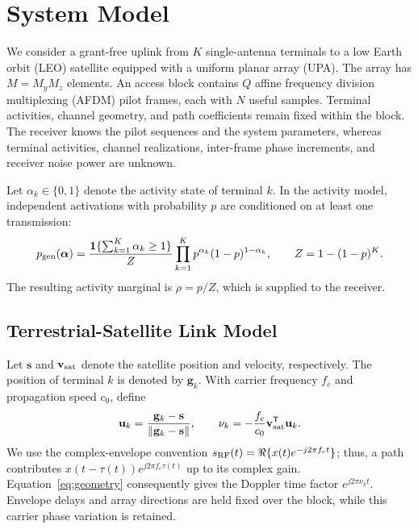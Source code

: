 \section{System Model}
\label{sec:system}

We consider a grant-free uplink from $K$ single-antenna terminals to a
low Earth orbit (LEO) satellite equipped with a uniform planar array (UPA).
The array has $M=M_yM_z$ elements. An access block contains $Q$ affine
frequency division multiplexing (AFDM) pilot frames, each with $N$ useful
samples. Terminal activities, channel geometry, and path coefficients
remain fixed within the block.
The receiver knows the pilot sequences and the system parameters,
whereas terminal activities, channel realizations, inter-frame phase
increments, and receiver noise power are unknown.

Let $\alpha_k\in\{0,1\}$ denote the activity state of terminal $k$.
In the activity model, independent activations with
probability $p$ are conditioned on at least one transmission:
\begin{equation}
 p_{\rm gen}(\bm\alpha)=
 \frac{\mathbf{1}\{\sum_{k=1}^{K}\alpha_k\geq1\}}{Z}
 \prod_{k=1}^{K}p^{\alpha_k}(1-p)^{1-\alpha_k},
 \qquad Z=1-(1-p)^K.
 \label{eq:activity-generation}
\end{equation}
The resulting activity marginal is $\rho=p/Z$, which is supplied to
the receiver.

\subsection{Terrestrial-Satellite Link Model}

Let $\mathbf{s}$ and $\mathbf{v}_{\rm sat}$ denote the satellite position
and velocity, respectively. The position of terminal $k$ is denoted by
$\mathbf{g}_k$.
With carrier frequency $f_c$ and propagation speed $c_0$, define
\begin{equation}
 \mathbf{u}_k=\frac{\mathbf{g}_k-\mathbf{s}}
 {\left\lVert\mathbf{g}_k-\mathbf{s}\right\rVert},
 \qquad
 \nu_k=-\frac{f_c}{c_0}\mathbf{v}_{\rm sat}^{\mathsf T}\mathbf{u}_k.
 \label{eq:geometry}
\end{equation}
We use the complex-envelope convention
$s_{\rm RF}(t)=\Re\{x(t)e^{-j2\pi f_ct}\}$; thus, a path contributes
$x(t-\tau(t))e^{j2\pi f_c\tau(t)}$ up to its complex gain.
Equation~\eqref{eq:geometry} consequently gives the Doppler time factor
$e^{j2\pi\nu_kt}$. Envelope delays and array directions are held fixed
over the block, while this carrier phase variation is retained.

